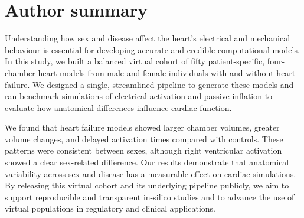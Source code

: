 \documentclass[10pt,letterpaper]{article}
\begin{document}

%
\section*{Author summary}
Understanding how sex and disease affect the heart’s electrical and mechanical behaviour is essential 
for developing accurate and credible computational models. 
In this study, we built a balanced virtual cohort of fifty patient-specific, four-chamber heart models 
from male and female individuals with and without heart failure. 
We designed a single, streamlined pipeline to generate these models and ran benchmark simulations of 
electrical activation and passive inflation to evaluate how anatomical differences influence cardiac function.

We found that heart failure models showed larger chamber volumes, greater volume changes, and 
delayed activation times compared with controls. 
These patterns were consistent between sexes, although right ventricular activation showed a clear 
sex-related difference. Our results demonstrate that anatomical variability across sex and disease 
has a measurable effect on cardiac simulations.
By releasing this virtual cohort and its underlying pipeline publicly, we aim to support reproducible and 
transparent in-silico studies and to advance the use of virtual populations in regulatory and clinical 
applications.

\linenumbers









\end{document}
